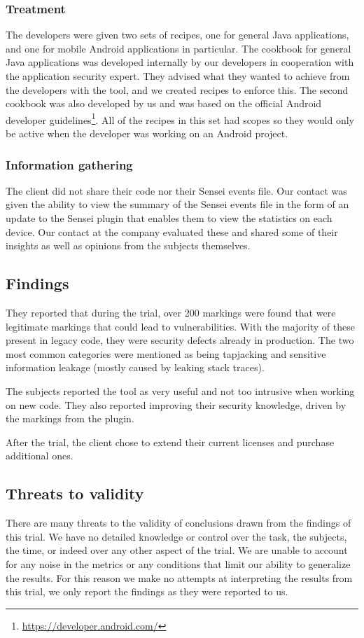 \subsubsection{Treatment}
The developers were given two sets of recipes, one for general Java applications, and one for mobile Android applications in particular.
The cookbook for general Java applications was developed internally by our developers in cooperation with the application security expert.
They advised what they wanted to achieve from the developers with the tool, and we created recipes to enforce this.
The second cookbook was also developed by us and was based on the official Android developer guidelines\footnote{\url{https://developer.android.com/}}.
All of the recipes in this set had scopes so they would only be active when the developer was working on an Android project.

\subsubsection{Information gathering}
The client did not share their code nor their Sensei events file.
Our contact was given the ability to view the summary of the Sensei events file in the form of an update to the Sensei plugin that enables them to view the statistics on each device.
Our contact at the company evaluated these and shared some of their insights as well as opinions from the subjects themselves.

\subsection{Findings}
They reported that during the trial, over 200 markings were found that were legitimate markings that could lead to vulnerabilities. With the majority of these present in legacy code, they were \glspl{security defect} already in production. The two most common categories were mentioned as being tapjacking and sensitive information leakage (mostly caused by leaking stack traces).

The subjects reported the tool as very useful and not too intrusive when working on new code. They also reported improving their security knowledge, driven by the markings from the plugin.

After the trial, the client chose to extend their current licenses and purchase additional ones.

\subsection{Threats to validity}
There are many threats to the validity of conclusions drawn from the findings of this trial. We have no detailed knowledge or control over the task, the subjects, the time, or indeed over any other aspect of the trial. We are unable to account for any noise in the metrics or any conditions that limit our ability to generalize the results. For this reason we make no attempts at interpreting the results from this trial, we only report the findings as they were reported to us.